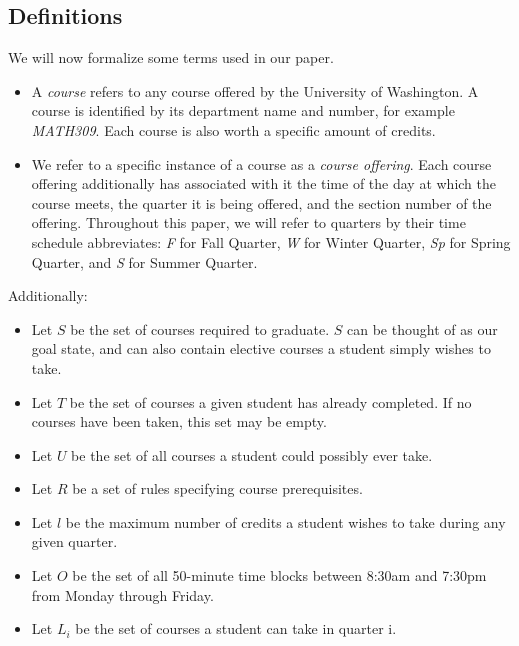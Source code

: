 \documentclass[11pt]{article} %
\begin{document}
\subsection{Definitions} We will now formalize some terms used in our paper.
\begin{itemize} \item A {\it course} refers to any course offered by the
University of Washington. A course is identified by its department name and
number, for example {\it MATH309}. Each course is also worth a specific amount
of credits. \item We refer to a specific instance of a course as a {\it course
offering}. Each course offering additionally has associated with it the time of
the day at which the course meets, the quarter it is being offered, and the
section number of the offering. Throughout this paper, we will refer to quarters
by their time schedule abbreviates: {\it F} for Fall Quarter, {\it W} for Winter
Quarter, {\it Sp} for Spring Quarter, and {\it S} for Summer Quarter.
\end{itemize}

Additionally: \begin{itemize} \item Let $S$ be the set of courses required to
graduate. $S$ can be thought of as our goal state, and can also contain elective
courses a student simply wishes to take.  \item Let $T$ be the set of courses
a given student has already completed. If no courses have been taken, this set
may be empty.  \item Let $U$ be the set of all courses a student could possibly
ever take.  \item Let $R$ be a set of rules specifying course prerequisites.
\item Let $l$ be the maximum number of credits a student wishes to take during
any given quarter.  \item Let $O$ be the set of all 50-minute time blocks
between 8:30am and 7:30pm from Monday through Friday. \item Let $L_i$ be the set
of courses a student can take in quarter i. \end{itemize}
\end{document}
